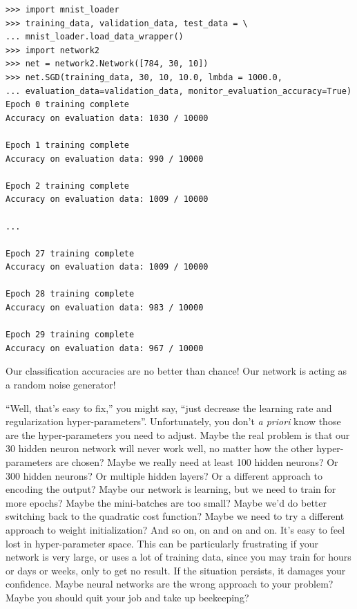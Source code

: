 \begin{lstlisting}
>>> import mnist_loader
>>> training_data, validation_data, test_data = \
... mnist_loader.load_data_wrapper()
>>> import network2
>>> net = network2.Network([784, 30, 10])
>>> net.SGD(training_data, 30, 10, 10.0, lmbda = 1000.0,
... evaluation_data=validation_data, monitor_evaluation_accuracy=True)
Epoch 0 training complete
Accuracy on evaluation data: 1030 / 10000

Epoch 1 training complete
Accuracy on evaluation data: 990 / 10000

Epoch 2 training complete
Accuracy on evaluation data: 1009 / 10000

...

Epoch 27 training complete
Accuracy on evaluation data: 1009 / 10000

Epoch 28 training complete
Accuracy on evaluation data: 983 / 10000

Epoch 29 training complete
Accuracy on evaluation data: 967 / 10000

\end{lstlisting}


Our classification accuracies are no better than chance! Our network is acting as a random noise generator!


``Well, that's easy to fix,'' you might say, ``just decrease the learning rate and regularization hyper-parameters''. Unfortunately, you don't \emph{a priori} know those are the hyper-parameters you need to adjust. Maybe the real problem is that our 30 hidden neuron network will never work well, no matter how the other hyper-parameters are chosen? Maybe we really need at least 100 hidden neurons? Or 300 hidden neurons? Or multiple hidden layers? Or a different approach to encoding the output? Maybe our network is learning, but we need to train for more epochs? Maybe the mini-batches are too small? Maybe we'd do better switching back to the quadratic cost function? Maybe we need to try a different approach to weight initialization? And so on, on and on and on. It's easy to feel lost in hyper-parameter space. This can be particularly frustrating if your network is very large, or uses a lot of training data, since you may train for hours or days or weeks, only to get no result. If the situation persists, it damages your confidence. Maybe neural networks are the wrong approach to your problem? Maybe you should quit your job and take up beekeeping?


